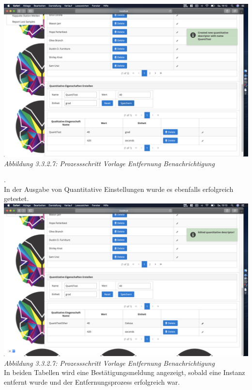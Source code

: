 \documentclass[enabledeprecatedfontcommands,fontsize=12pt,paper=a4,twoside]{scrartcl}
\begin{document}
\hypertarget{sc3.3.3.7}{
\includegraphics[width=1\textwidth]{Screenshots/336AddQuantitativMeldung.png}
\textit{Abbildung 3.3.2.7: Prozessschritt Vorlage Entfernung Benachrichtigung}
} .\\
In der Ausgabe von Quantitative Einstellungen wurde es ebenfalls erfolgreich getestet.\\
\hypertarget{sc3.3.3.7}{
\includegraphics[width=1\textwidth]{Screenshots/336EditMeldungQuantDes.png}
\textit{Abbildung 3.3.2.7: Prozessschritt Vorlage Entfernung Benachrichtigung}
}  \\
In beiden Tabellen wird eine Bestätigungsmeldung angezeigt, sobald eine Instanz entfernt wurde und der Entfernungsprozess erfolgreich war.\\
\end{document}
